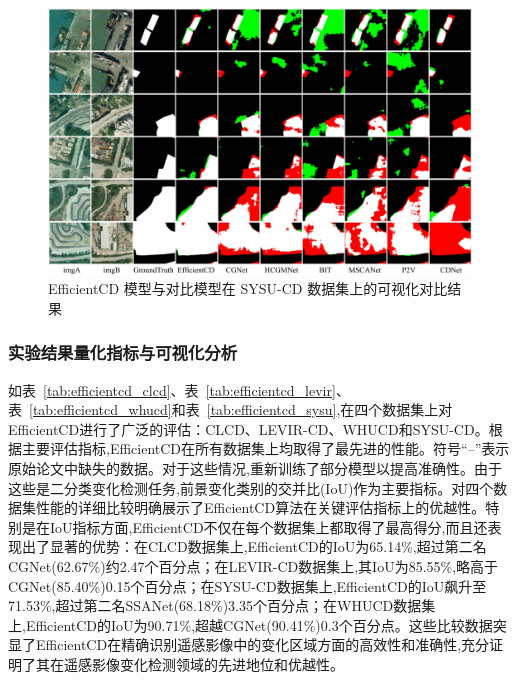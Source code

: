 \begin{figure}[!htb]
  \centering
  \includegraphics[width=\textwidth]{paper_figures/基于双时相遥感影像特征交互的变化检测算法研究/EfficientCD/efficientcd_sysu.png}
  \caption{EfficientCD 模型与对比模型在 SYSU-CD 数据集上的可视化对比结果}
  \label{fig:efficientcd_sysu}
\end{figure}


\subsubsection{实验结果量化指标与可视化分析}

如表~\ref{tab:efficientcd_clcd}、表~\ref{tab:efficientcd_levir}、表~\ref{tab:efficientcd_whucd}和表~\ref{tab:efficientcd_sysu},在四个数据集上对EfficientCD进行了广泛的评估：CLCD、LEVIR-CD、WHUCD和SYSU-CD。根据主要评估指标,EfficientCD在所有数据集上均取得了最先进的性能。符号``--''表示原始论文中缺失的数据。对于这些情况,重新训练了部分模型以提高准确性。由于这些是二分类变化检测任务,前景变化类别的交并比(IoU)作为主要指标。对四个数据集性能的详细比较明确展示了EfficientCD算法在关键评估指标上的优越性。特别是在IoU指标方面,EfficientCD不仅在每个数据集上都取得了最高得分,而且还表现出了显著的优势：在CLCD数据集上,EfficientCD的IoU为65.14\%,超过第二名CGNet(62.67\%)约2.47个百分点；在LEVIR-CD数据集上,其IoU为85.55\%,略高于CGNet(85.40\%)0.15个百分点；在SYSU-CD数据集上,EfficientCD的IoU飙升至71.53\%,超过第二名SSANet(68.18\%)3.35个百分点；在WHUCD数据集上,EfficientCD的IoU为90.71\%,超越CGNet(90.41\%)0.3个百分点。这些比较数据突显了EfficientCD在精确识别遥感影像中的变化区域方面的高效性和准确性,充分证明了其在遥感影像变化检测领域的先进地位和优越性。

